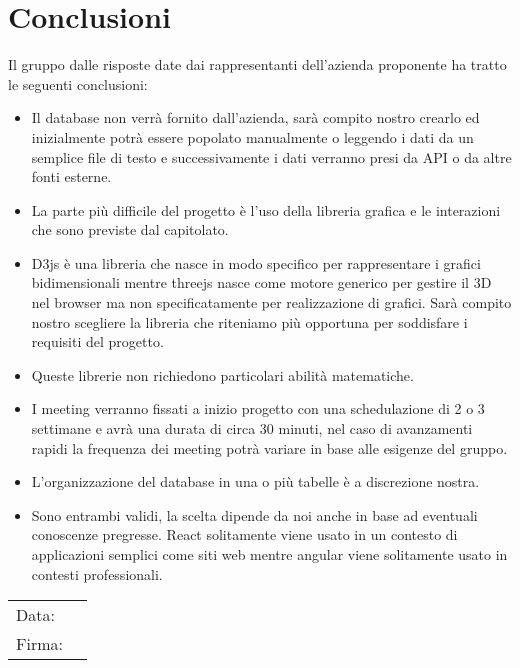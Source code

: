 \documentclass[a4paper, 12pt]{article}
\begin{document}
\section{Conclusioni}
Il gruppo dalle risposte date dai rappresentanti dell'azienda proponente ha tratto le seguenti conclusioni:
\begin{itemize}
    \item Il database non verrà fornito dall'azienda, sarà compito nostro crearlo ed inizialmente potrà essere popolato manualmente o leggendo i dati da un semplice file di testo e successivamente i dati verranno presi da API o da altre fonti esterne.

    \item La parte più difficile del progetto è l'uso della libreria grafica e le interazioni che sono previste dal capitolato.

    \item D3js è una libreria che nasce in modo specifico per rappresentare i grafici bidimensionali mentre threejs nasce come motore generico per gestire il 3D nel browser ma non specificatamente per realizzazione di grafici. Sarà compito nostro scegliere la libreria che riteniamo più opportuna per soddisfare i requisiti del progetto.

    \item Queste librerie non richiedono particolari abilità matematiche.

    \item I meeting verranno fissati a inizio progetto con una schedulazione di 2 o 3 settimane e avrà una durata di circa 30 minuti, nel caso di avanzamenti rapidi la frequenza dei meeting potrà variare in base alle esigenze del gruppo.

    \item L'organizzazione del database in una o più tabelle è a discrezione nostra.
    
    \item Sono entrambi validi, la scelta dipende da noi anche in base ad eventuali conoscenze pregresse. React solitamente viene usato in un contesto di applicazioni semplici come siti web mentre angular viene solitamente usato in contesti professionali.
\end{itemize}


\vfill
{\renewcommand{\arraystretch}{2}
\begin{tabular}{l p{5cm}}
    Data: &  \hrulefill \\
    Firma: & \hrulefill \\
\end{tabular}
}
\end{document}
